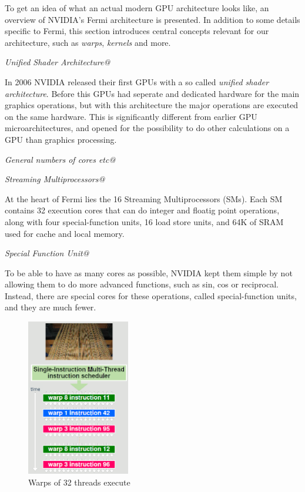 \documentclass[../main/report.tex]{subfiles}
\begin{document}
To get an idea of what an actual modern GPU architecture looks like, an overview of NVIDIA's Fermi architecture is presented.
In addition to some details specific to Fermi, this section introduces central concepts relevant for our architecture, such as \emph{warps}, \emph{kernels} and more.


\emph{Unified Shader Architecture@}

In 2006 NVIDIA released their first GPUs with a so called \emph{unified shader architecture}.
Before this GPUs had seperate and dedicated hardware for the main graphics operations, 
but with this architecture the major operations are executed on the same hardware.
This is significantly different from earlier GPU microarchitectures, and opened
for the possibility to do other calculations on a GPU than graphics processing.


\emph{General numbers of cores etc@}


\emph{Streaming Multiprocessors@}

At the heart of Fermi lies the 16 Streaming Multiprocessors (SMs). 
Each SM contains 32 execution cores that can do integer and floatig point operations, 
along with four special-function units, 16 load store units, 
and 64K of SRAM used for cache and local memory.

\emph{Special Function Unit@}

To be able to have as many cores as possible, NVIDIA kept them simple by not allowing them to do more advanced functions, such as sin, cos or reciprocal.
Instead, there are special cores for these operations, called special-function units, and they are much fewer.

\begin{figure}[H]
\centering
\includegraphics[width=0.4\textwidth]{../introduction/assets/warp.png}
\caption{Warps of 32 threads execute }
\label{fig:simple-nvidia-warps}
\end{figure}
\end{document}
